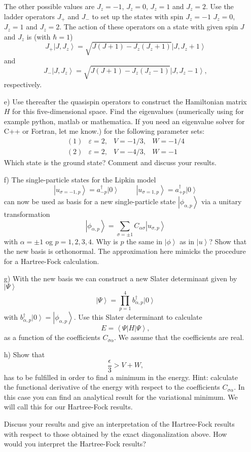 \documentclass[11pt,a4wide]{article}
\newcommand{\bra}[1]{\left\langle #1 \right|}
\newcommand{\ket}[1]{\left| #1 \right\rangle}
\begin{document}
\begin{enumerate}
The other possible values are  $J_{z}=-1$, $J_{z}=0$, $J_{z}=1$
and $J_{z}=2$. 
Use the ladder operators
$J_{+}$ and $J_{-}$  to set up the states 
with spin $J_{z}=-1$ $J_{z}=0$, $J_{z}=1$
and $J_{z}=2$.  
The action of these operators on a state with given spin 
$J$ and $J_z$ is  (with $\hbar = 1$) 
\[
J_+\ket{J,J_z}=\sqrt{J(J+1)-J_z(J_z+1)}\ket{J,J_z+1}
\] 
and
\[
J_-\ket{J,J_z}=\sqrt{J(J+1)-J_z(J_z-1)}\ket{J,J_z-1},
\] respectively.
\newline
\item[e)] Use thereafter the quasispin operators to construct the Hamiltonian matrix 
$H$ for this five-dimensional space.  Find the eigenvalues
(numerically using for example python, matlab or mathematica. If you need an eigenvalue solver for C++ or Fortran, let me know.)  for the following parameter sets:
\[
\begin{array}{cccc}
(1)&\varepsilon=2,&V=-1/3,&W=-1/4\\
(2)&\varepsilon=2,&V=-4/3,&W=-1
\end{array}
\]
Which state is the ground state? Comment and discuss your results.\newline
\item[f)]
The single-particle states for the 
 Lipkin model
\[
\ket{u_{\sigma =-1,p}}=a_{-p}^{\dagger}\ket{0}
\hspace{1cm}
\ket{u_{\sigma =1,p}}=a_{+p}^{\dagger}\ket{0}
\]
can now be used as basis for a new single-particle state
$\ket{\phi_{\alpha ,p}}$  via a unitary  transformation
\[
\ket{\phi_{\alpha ,p}}=
\sum_{\sigma =\pm1}C_{\alpha\sigma}\ket{u_{\sigma ,p}}
\]
with $\alpha=\pm 1$ og $p=1,2,3,4$. Why is $p$ the same in 
$\ket{\phi}$
as in $\ket{u}$?  Show that the new basis is orthonormal.
The approximation here mimicks the procedure for a Hartree-Fock calculation. 
\newline
\item[g)] With the new basis we can construct a new Slater determinant given by
$\ket{\Psi}$
\[
\ket{\Psi}=\prod_{p=1}^{4}b_{\alpha ,p}^{\dagger}\ket{0}
\]
with $b_{\alpha ,p}^{\dagger}\ket{0}=\ket{\phi_{\alpha ,p}}$. Use this Slater determinant to calculate
\[
E=\bra{\Psi}H\ket{\Psi},
\]
as a function of the coefficients $C_{\sigma\alpha}$. We assume that the coefficients are real.\newline
\item[h)] Show that
\[
  \frac{\epsilon}{3} > V+W,
\]
has to be fulfilled in order to find a minimum in the energy.
Hint: calculate the functional derivative  of the energy with respect to the coefficients $C_{\sigma\alpha}$. In this case you can find an analytical result for the variational minimum. We will call this for our Hartree-Fock results.

Discuss your results and give an interpretation of the Hartree-Fock results with respect to those obtained
by the exact diagonalization above. How would you interpret the Hartree-Fock results?


\end{enumerate}
\end{document}
